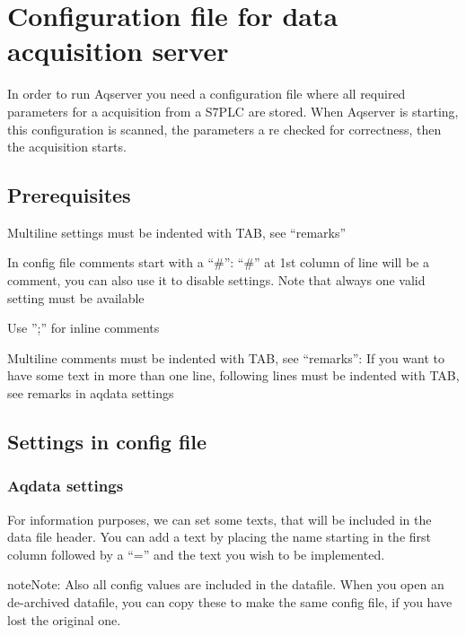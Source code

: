 \documentclass[a4paper,10pt,english]{sphinxmanual}
\begin{document}
\chapter{Configuration file for data acquisition server}
\label{configuration:configuration-file-for-data-acquisition-server}\label{configuration::doc}
In order to run Aqserver you need a configuration file where all required parameters for a acquisition from a S7PLC are stored.  When Aqserver is starting, this configuration is scanned, the parameters a re checked for correctness, then the acquisition starts.


\section{Prerequisites}
\label{configuration:prerequisites}
Multiline settings must be indented with TAB, see ``remarks''

In config file comments start with a ``\#'':
``\#'' at 1st column of line will be a comment, you can also use it to disable settings. Note
that always one valid setting must be available

Use '';'' for inline comments

Multiline comments must be indented with TAB, see ``remarks'':
If you want to have some text in more than one line, following lines must
be indented with TAB, see remarks in aqdata settings


\section{Settings in config file}
\label{configuration:settings-in-config-file}

\subsection{Aqdata settings}
\label{configuration:aqdata-settings}
For information purposes, we can set some texts, that will be included in the data file header.
You can add a text by placing the name starting in the first column followed by a ``='' and the text you wish to be implemented.

\begin{notice}{note}{Note:}
Also all config values are included in the datafile. When you open an de-archived datafile, you can copy these to make the same config file, if you have lost the original one.
\end{notice}
\end{document}
